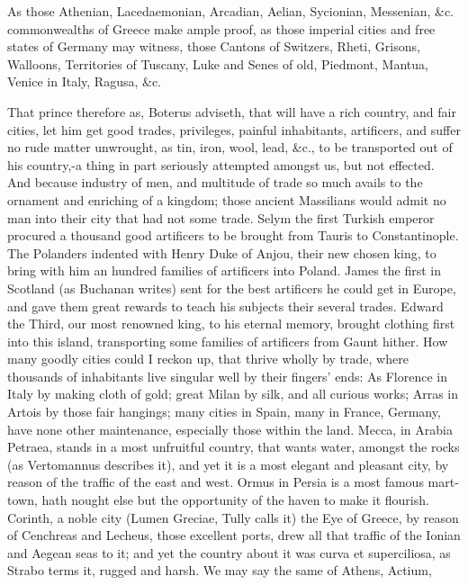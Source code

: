 {As those Athenian, Lacedaemonian, Arcadian, Aelian, Sycionian,
Messenian, \&c. commonwealths of Greece make ample proof, as those
imperial cities and free states of Germany may witness, those Cantons
of Switzers, Rheti, Grisons, Walloons, Territories of Tuscany, Luke and
Senes of old, Piedmont, Mantua, Venice in Italy, Ragusa, \&c.

That prince therefore as, Boterus adviseth, that will have a rich
country, and fair cities, let him get good trades, privileges, painful
inhabitants, artificers, and suffer no rude matter unwrought, as tin,
iron, wool, lead, \&c., to be transported out of his country,-a
thing in part seriously attempted amongst us, but not effected. And
because industry of men, and multitude of trade so much avails to the
ornament and enriching of a kingdom; those ancient Massilians
would admit no man into their city that had not some trade. Selym the
first Turkish emperor procured a thousand good artificers to be brought
from Tauris to Constantinople. The Polanders indented with Henry Duke
of Anjou, their new chosen king, to bring with him an hundred families
of artificers into Poland. James the first in Scotland (as
Buchanan writes) sent for the best artificers he could get in
Europe, and gave them great rewards to teach his subjects their several
trades. Edward the Third, our most renowned king, to his eternal
memory, brought clothing first into this island, transporting some
families of artificers from Gaunt hither. How many goodly cities could
I reckon up, that thrive wholly by trade, where thousands of
inhabitants live singular well by their fingers' ends: As Florence in
Italy by making cloth of gold; great Milan by silk, and all curious
works; Arras in Artois by those fair hangings; many cities in Spain,
many in France, Germany, have none other maintenance, especially those
within the land. Mecca, in Arabia Petraea, stands in a most
unfruitful country, that wants water, amongst the rocks (as Vertomannus
describes it), and yet it is a most elegant and pleasant city, by
reason of the traffic of the east and west. Ormus in Persia is a most
famous mart-town, hath nought else but the opportunity of the haven to
make it flourish. Corinth, a noble city (Lumen Greciae, Tully calls it)
the Eye of Greece, by reason of Cenchreas and Lecheus, those excellent
ports, drew all that traffic of the Ionian and Aegean seas to it; and
yet the country about it was curva et superciliosa, as Strabo
terms it, rugged and harsh. We may say the same of Athens, Actium,
}
